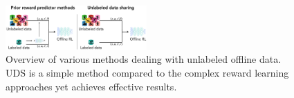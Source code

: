 \documentclass[../thesis.tex]{subfiles}
\begin{document}
\begin{figure}[ht]
    \centering
    \includegraphics[width=0.48\textwidth]{chapters/uds/teaser_new.png}
    \vspace{-0.6cm}
    \caption{\footnotesize  Overview of various methods dealing with unlabeled offline data. UDS is a simple method compared to the complex reward learning approaches yet achieves effective results.}
    \vspace{-0.55cm}
    \label{fig:uds_teaser}
\end{figure}


    
\end{document}
